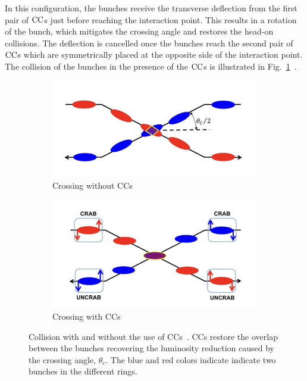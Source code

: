 In this configuration, the bunches receive the transverse deflection from the first pair of ${\mathrm{CC}}$s just before reaching the interaction point. This results in a rotation of the bunch, which mitigates the crossing angle and restores the head-on collisions. The deflection is cancelled once the bunches reach the second pair of ${\mathrm{CC}}$s which are symmetrically placed at the opposite side of the interaction point. The collision of the bunches in the presence of the ${\mathrm{CC}}$s is illustrated in Fig.~\ref{fig:crossing_with_and_without_CCs}~\cite{Verdú-Andrés:2263119}.

\begin{figure}[!ht]
    \centering
    \begin{subfigure}[t]{0.45\textwidth}
        \centering
        \includegraphics[width=1\textwidth]{images/introduction/no_crab_crossing.png}
        \caption{Crossing without CCs}
    \end{subfigure}
    \hfill
    \begin{subfigure}[t]{0.45\textwidth}
        \centering
        \includegraphics[width=1\textwidth]{images/introduction/crab_crossing.png}
        \caption{Crossing with CCs}
    \end{subfigure}
    \hfill
     \caption{Collision with and without the use of CCs~\cite{Verdú-Andrés:2263119}. CCs restore the overlap between the bunches recovering the luminosity reduction caused by the crossing angle, $\theta_c$. The blue and red colors indicate indicate two bunches in the different rings.} 
     \label{fig:crossing_with_and_without_CCs}
 \end{figure}


